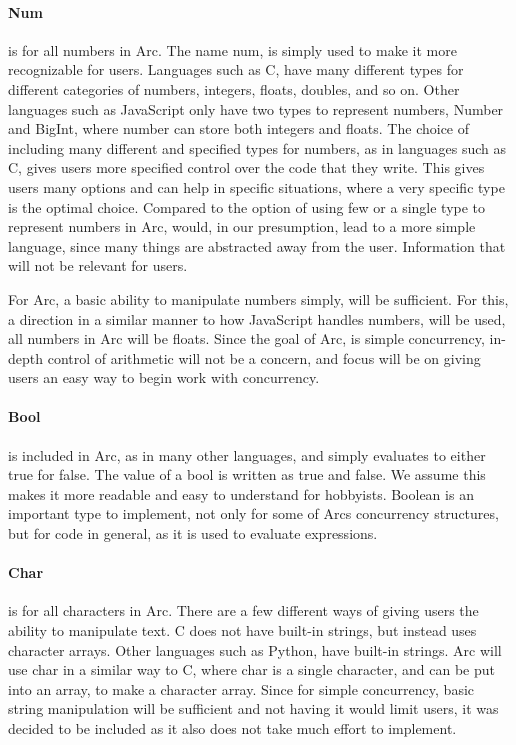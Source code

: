 \paragraph{Num} is for all numbers in Arc. The name num, is simply used to make it more recognizable for users. Languages such as C, have many different types for different categories of numbers, integers, floats, doubles, and so on. Other languages such as JavaScript only have two types to represent numbers, Number and BigInt, where number can store both integers and floats.
The choice of including many different and specified types for numbers, as in languages such as C, gives users more specified control over the code that they write. This gives users many options and can help in specific situations, where a very specific type is the optimal choice.
Compared to the option of using few or a single type to represent numbers in Arc, would, in our presumption, lead to a more simple language, since many things are abstracted away from the user. Information that will not be relevant for users.

For Arc, a basic ability to manipulate numbers simply, will be sufficient. For this, a direction in a similar manner to how JavaScript handles numbers, will be used, all numbers in Arc will be floats. Since the goal of Arc, is simple concurrency, in-depth control of arithmetic will not be a concern, and focus will be on giving users an easy way to begin work with concurrency.

\paragraph{Bool} is included in Arc, as in many other languages, and simply evaluates to either true for false. The value of a bool is written as true and false. We assume this makes it more readable and easy to understand for hobbyists. Boolean is an important type to implement, not only for some of Arcs concurrency structures, but for code in general, as it is used to evaluate expressions. 

\paragraph{Char} is for all characters in Arc. There are a few different ways of giving users the ability to manipulate text. C does not have built-in strings, but instead uses character arrays. Other languages such as Python, have built-in strings. Arc will use char in a similar way to C, where char is a single character, and can be put into an array, to make a character array. Since for simple concurrency, basic string manipulation will be sufficient and not having it would limit users, it was decided to be included as it also does not take much effort to implement. 


